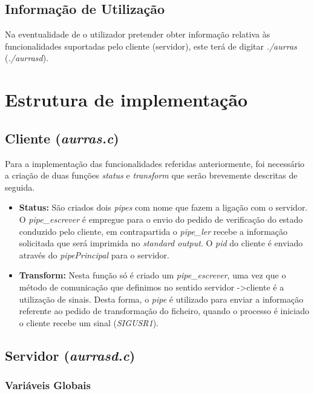 \documentclass[11pt,a4paper]{report}
\begin{document}
\section{Informação de Utilização}

Na eventualidade de o utilizador pretender obter informação relativa às funcionalidades suportadas pelo cliente (servidor), este terá de digitar \emph{./aurras} (\emph{./aurrasd}). 

\chapter{Estrutura de implementação}

\section{Cliente (\emph{aurras.c})}

Para a implementação das funcionalidades referidas anteriormente, foi necessário a criação de duas funções \emph{status} e \emph{transform} que serão brevemente descritas de seguida.

 \begin{itemize}
\item \textbf{Status: } São criados dois \emph{pipes} com nome que fazem a ligação com o servidor. O \emph{pipe\_escrever} é empregue para o envio do pedido de verificação do estado conduzido pelo cliente, em contrapartida o \emph{pipe\_ler} recebe a informação solicitada que será imprimida no \emph{standard output}. O \emph{pid} do cliente é enviado através do \emph{pipePrincipal} para o servidor.
\item \textbf{Transform: } Nesta função só é criado um \emph{pipe\_escrever}, uma vez que o método de comunicação que definimos no sentido servidor -\textgreater cliente é a utilização de sinais. Desta forma, o \emph{pipe} é utilizado para enviar a informação referente ao pedido de transformação do ficheiro, quando o processo é iniciado o cliente recebe um sinal (\emph{SIGUSR1}).
\end{itemize}

\section{Servidor (\emph{aurrasd.c})}

\subsection{Variáveis Globais}
\end{document}
